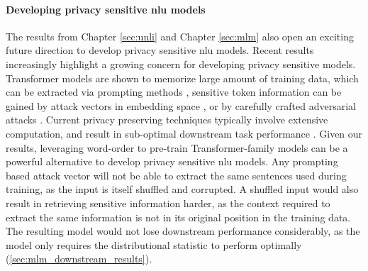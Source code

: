 \documentclass[letterpaper, 12pt]{report}
\begin{document}
\paragraph{Developing privacy sensitive \acrshort{nlu} models}
The results from Chapter \autoref{sec:unli} and Chapter \autoref{sec:mlm} also open an exciting future direction to develop privacy sensitive \acrshort{nlu} models. Recent results increasingly highlight a growing concern for developing privacy sensitive models. Transformer models are shown to memorize large amount of training data, which can be extracted via prompting methods \citep{carlini2021, carlini2022a}, sensitive token information can be gained by attack vectors in embedding space \citep{song2020information}, or by carefully crafted adversarial attacks \citep{henderson2018ethical}. Current privacy preserving techniques typically involve extensive computation, and result in sub-optimal downstream task performance \citep{jayaraman2019evaluating}. Given our results, leveraging word-order to pre-train Transformer-family models can be a powerful alternative to develop privacy sensitive \acrshort{nlu} models. Any prompting based attack vector will not be able to extract the same sentences used during training, as the input is itself shuffled and corrupted. A shuffled input would also result in retrieving sensitive information harder, as the context required to extract the same information is not in its original position in the training data. The resulting model would not lose downstream performance considerably, as the model only requires the distributional statistic to perform optimally (\autoref{sec:mlm_downstream_results}).

\clearpage





\printglossaries


\end{document}
